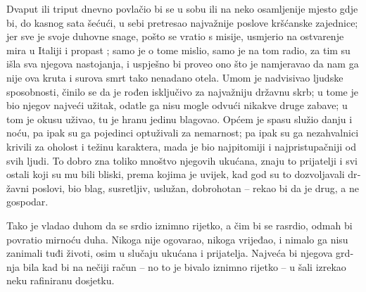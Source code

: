 \documentclass[a5paper,twoside]{article}
\begin{document}
\begin{pages}
\begin{Rightside}
\begin{croatian}
\pend
\pstart
Dvaput ili triput dnevno povlačio bi se u sobu ili na neko osamljenije mjesto gdje bi, do kasnog sata šećući, u sebi pretresao najvažnije poslove kršćanske zajednice; jer sve je svoje duhovne snage, pošto se vratio s misije, usmjerio na ostvarenje mira u Italiji i propast ; samo je o tome mislio, samo je na tom radio, za tim su išla sva njegova nastojanja, i uspješno bi proveo ono što je namjeravao da nam ga nije ova kruta i surova smrt tako nenadano otela.  Umom je nadvisivao ljudske sposobnosti, činilo se da je rođen isključivo za najvažniju državnu skrb; u tome je bio njegov najveći užitak, odatle ga nisu mogle odvući nikakve druge zabave; u tom je okusu uživao, tu je hranu jedinu blagovao.  Općem je spasu služio danju i noću, pa ipak su ga pojedinci optuživali za nemarnost; pa ipak su ga nezahvalnici krivili za oholost i težinu karaktera, mada je bio najpitomiji i najpristupačniji od svih ljudi.  To dobro zna toliko mnoštvo njegovih ukućana, znaju to prijatelji i svi ostali koji su mu bili bliski, prema kojima je uvijek, kad god su to dozvoljavali državni poslovi, bio blag, susretljiv, uslužan, dobrohotan – rekao bi da je drug, a ne gospodar.

\pend
\pstart
Tako je vladao duhom da se srdio iznimno rijetko, a čim bi se rasrdio, odmah bi povratio mirnoću duha.  Nikoga nije ogovarao, nikoga vrijeđao, i nimalo ga nisu zanimali tuđi životi, osim u slučaju ukućana i prijatelja.  Najveća bi njegova grdnja bila kad bi na nečiji račun – no to je bivalo iznimno rijetko – u šali izrekao neku rafiniranu dosjetku.


\end{croatian}
\end{Rightside}
\end{pages}
\end{document}
